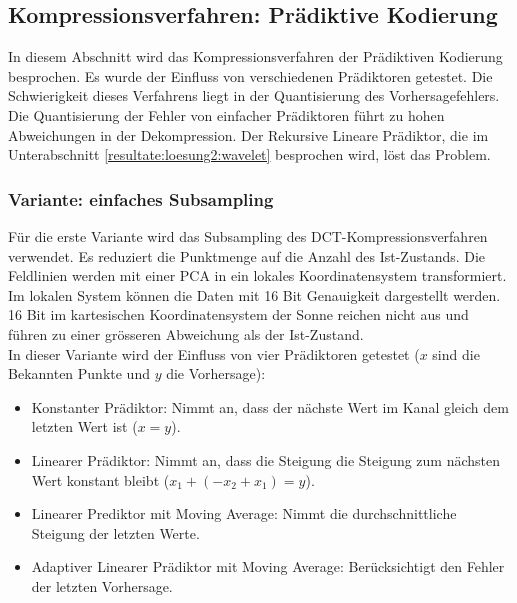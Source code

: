 \subsection{Kompressionsverfahren: Prädiktive Kodierung}  \label{resultate:loesung2}
In diesem Abschnitt wird das Kompressionsverfahren der Prädiktiven Kodierung besprochen. Es wurde der Einfluss von verschiedenen Prädiktoren getestet. Die Schwierigkeit dieses Verfahrens liegt in der Quantisierung des Vorhersagefehlers. Die Quantisierung der Fehler von einfacher Prädiktoren führt zu hohen Abweichungen in der Dekompression. Der Rekursive Lineare Prädiktor, die im Unterabschnitt \ref{resultate:loesung2:wavelet} besprochen wird, löst das Problem.

\subsubsection{Variante: einfaches Subsampling}
Für die erste Variante wird das Subsampling des DCT-Kompressionsverfahren verwendet. Es reduziert die Punktmenge auf die Anzahl des Ist-Zustands. Die Feldlinien werden mit einer PCA in ein lokales Koordinatensystem transformiert. Im lokalen System können die Daten mit 16 Bit Genauigkeit dargestellt werden. 16 Bit im kartesischen Koordinatensystem der Sonne reichen nicht aus und führen zu einer grösseren Abweichung als der Ist-Zustand.\\
In dieser Variante wird der Einfluss von vier Prädiktoren getestet ($x$ sind die Bekannten Punkte und $y$ die Vorhersage):
\begin{itemize}
\item Konstanter Prädiktor: Nimmt an, dass der nächste Wert im Kanal gleich dem  letzten Wert ist ($x = y$).
\item Linearer Prädiktor: Nimmt an, dass die Steigung die Steigung zum nächsten Wert konstant bleibt ($x_1+(-x_2+x_1) = y$).
\item Linearer Prediktor mit Moving Average: Nimmt die durchschnittliche Steigung der letzten Werte.
\item Adaptiver Linearer Prädiktor mit Moving Average: Berücksichtigt den Fehler der letzten Vorhersage.
\end{itemize}

